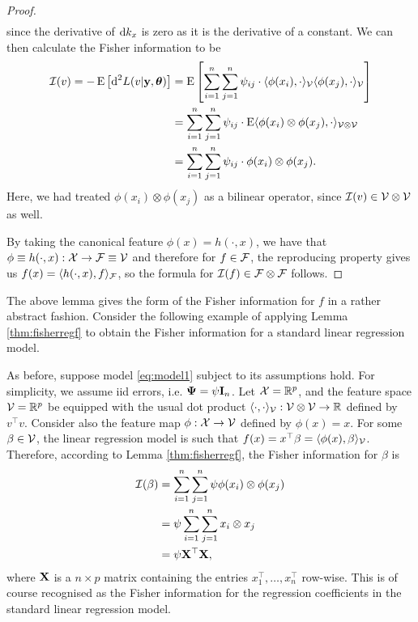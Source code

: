 \begin{proof}
\begin{align*}
	\end{align*}
	since the derivative of $\text{d} k_{x}$ is zero as it is the derivative of a constant.
	We can then calculate the Fisher information to be
	\begin{align*}
		{\mathcal I}(v) = -\operatorname{E} \big[ \text{d}^2 L(v|{\mathbf y},{\bm\theta}) \big] 
		&=\operatorname{E} \left[ \sum_{i=1}^n\sum_{j=1}^n \psi_{ij} \cdot \langle \phi(x_i), \cdot \rangle_{{\mathcal V}} \langle \phi(x_j), \cdot \rangle_{{\mathcal V}} \right] \\
		&= \sum_{i=1}^n\sum_{j=1}^n \psi_{ij} \cdot \operatorname{E}\langle \phi(x_i) \otimes \phi(x_j), \cdot \rangle_{{\mathcal V}\otimes{\mathcal V}}  \\		
		&=\sum_{i=1}^n\sum_{j=1}^n \psi_{ij} \cdot \phi(x_i) \otimes \phi(x_j).
	\end{align*}	 	
	Here, we had treated $\phi(x_i) \otimes \phi(x_j)$ as a bilinear operator, since ${\mathcal I}(v) \in {\mathcal V} \otimes {\mathcal V}$ as well.
	
	By taking the canonical feature $\phi(x)=h(\cdot,x)$, we have that $\phi \equiv h(\cdot,x):{\mathcal X}\to{\mathcal F} \equiv {\mathcal V}$ and therefore for $f\in{\mathcal F}$, the reproducing property gives us $f(x) = \langle h(\cdot,x),f\rangle_{\mathcal F}$, so the formula for ${\mathcal I}(f) \in {\mathcal F} \otimes {\mathcal F}$ follows.
\end{proof}

The above lemma gives the form of the Fisher information for $f$ in a rather abstract fashion.
Consider the following example of applying Lemma \eqref{thm:fisherregf} to obtain the Fisher information for a standard linear regression model.

\begin{example}
  As before, suppose model \eqref{eq:model1} subject to its assumptions hold.
  For simplicity, we assume iid errors, i.e. ${\bm\Psi} = \psi {\mathbf I}_n$.
  Let ${\mathcal X} = \mathbb{R}^p$, and the feature space ${\mathcal V} = \mathbb{R}^p$ be equipped with the usual dot product $\langle\cdot,\cdot\rangle_{\mathcal V}:{\mathcal V} \otimes {\mathcal V} \to \mathbb{R}$ defined by $v^\top v$.
  Consider also the feature map $\phi:{\mathcal X} \to {\mathcal V}$ defined by $\phi(x)=x$.
  For some $\beta \in {\mathcal V}$, the linear regression model is such that $f(x) = x^\top \beta = \langle\phi(x),\beta\rangle_{\mathcal V}$.
  Therefore, according to Lemma \eqref{thm:fisherregf}, the Fisher information for $\beta$ is
  \begin{align*}
    {\mathcal I}(\beta) 
    &= \sum_{i=1}^n\sum_{j=1}^n \psi \phi(x_i) \otimes \phi(x_j) \\
    &= \psi \sum_{i=1}^n\sum_{j=1}^n x_i \otimes x_j \\
    &= \psi {\mathbf X}^\top {\mathbf X},
  \end{align*}
  where ${\mathbf X}$ is a $n \times p$ matrix containing the entries $x_1^\top,\dots,x_n^\top$ row-wise.
  This is of course recognised as the Fisher information for the regression coefficients in the standard linear regression model.
\end{example}

